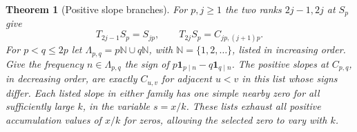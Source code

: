\documentclass[11pt,a4paper]{article}
\newtheorem{theorem}{Theorem}[section]
\theoremstyle{definition}\newtheorem{definition}[theorem]{Definition}\newtheorem{example}[theorem]{Example}
\theoremstyle{remark}\newtheorem{remark}[theorem]{Remark}
\begin{document}
\begin{theorem}[Positive slope branches]\label{thm:rev-branch-spec}
For $p,j\ge1$ the two ranks $2j-1,2j$ at $S_p$ give
\[
 T_{2j-1}S_p=S_{jp},\qquad T_{2j}S_p=C_{jp,(j+1)p}.
\]
For $p<q\le2p$ let $\Lambda_{p,q}=p\mathbb N\cup q\mathbb N$, with $\mathbb N=\{1,2,\ldots\}$, listed in increasing order. Give the frequency $n\in\Lambda_{p,q}$ the sign of
$p\mathbf 1_{p\mid n}-q\mathbf 1_{q\mid n}$. The positive slopes at $C_{p,q}$, in decreasing order, are exactly $C_{u,v}$ for adjacent $u<v$ in this list whose signs differ. Each listed slope in either family has one simple nearby zero for all sufficiently large $k$, in the variable $s=x/k$. These lists exhaust all positive accumulation values of $x/k$ for zeros, allowing the selected zero to vary with $k$.
\end{theorem}
\end{document}
